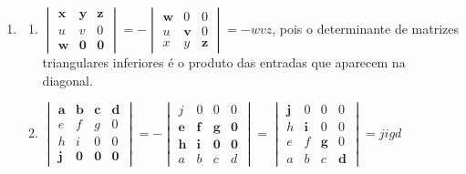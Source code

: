 \documentclass[12pt,a4paper]{article}
\begin{document}
\begin{enumerate}
\item \begin{enumerate}
\item 
$\begin{vmatrix}
\textbf{x} & \textbf{y} & \textbf{z} \\
u & v & 0 \\
\textbf{w} & \textbf{0} & \textbf{0}
\end{vmatrix}
= -
\begin{vmatrix}
\textbf{w} & 0 & 0 \\
u & \textbf{v} & 0 \\
x & y & \textbf{z}
\end{vmatrix}
= -wvz$, pois o determinante de matrizes triangulares inferiores é o produto das entradas que aparecem na diagonal.

\item 
$\begin{vmatrix}
\textbf{a} & \textbf{b} & \textbf{c} & \textbf{d} \\
e & f & g & 0\\
h & i & 0 & 0\\
\textbf{j} & \textbf{0} & \textbf{0} & \textbf{0}
\end{vmatrix}
= -
\begin{vmatrix}
j & 0 & 0 & 0\\
\textbf{e} & \textbf{f} & \textbf{g} & \textbf{0}\\
\textbf{h} & \textbf{i} & \textbf{0} & \textbf{0}\\
a & b & c & d
\end{vmatrix}
=
\begin{vmatrix}
\textbf{j} & 0 & 0 & 0\\
h & \textbf{i} & 0 & 0\\
e & f & \textbf{g} & 0\\
a & b & c & \textbf{d}
\end{vmatrix}
= jigd$


\end{enumerate}
\end{enumerate}
\end{document}
